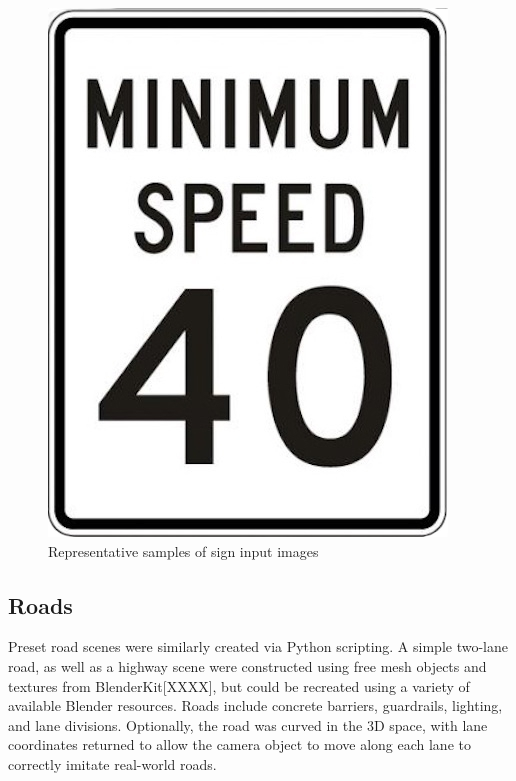 \documentclass[journal]{IEEEtran}
\begin{document}
\begin{figure}[ht]
\begin{minipage}{0.1\textwidth}
    \end{minipage}\hfill
    \begin{minipage}{0.1\textwidth}
        \centering
        \includegraphics[width=\linewidth]{images/Minimum Speed 40.png}

    \end{minipage}
    \caption{Representative samples of sign input images}
    \label{fig:row_of_images}
\end{figure}

\subsection{Roads}
Preset road scenes were similarly created via Python scripting. A simple two-lane road, as well as a highway scene were constructed using free mesh objects and textures from BlenderKit[XXXX], but could be recreated using a variety of available Blender resources. Roads include concrete barriers, guardrails, lighting, and lane divisions. Optionally, the road was curved in the 3D space, with lane coordinates returned to allow the camera object to move along each lane to correctly imitate real-world roads. 
\end{document}
